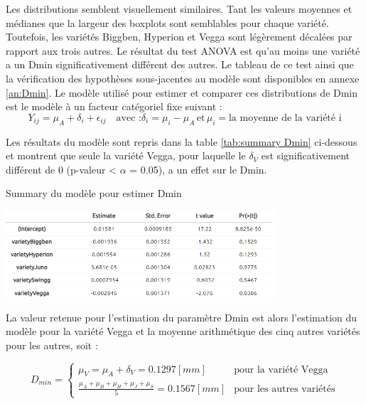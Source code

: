 Les distributions semblent visuellement similaires.
Tant les valeurs moyennes et médianes que la largeur des boxplots sont semblables pour chaque variété.
Toutefois, les variétés Biggben, Hyperion et Vegga sont légèrement décalées par rapport aux trois autres.
Le résultat du test ANOVA est qu'au moins une variété a un Dmin significativement différent des autres.
Le tableau de ce test ainsi que la vérification des hypothèses sous-jacentes au modèle sont disponibles en annexe \ref{an:Dmin}.
Le modèle utilisé pour estimer et comparer ces distributions de Dmin est le modèle à un facteur catégoriel fixe suivant :
\begin{equation}
    Y_{ij} = \mu_{A}+\delta_{i}+\epsilon_{ij} \quad \text{avec :} \delta_{i}=\mu_{i}-\mu_{A} \, \text{et} \, \mu_{i} = \text{la moyenne de la variété i}
\end{equation}

Les résultats du modèle sont repris dans la table \ref{tab:summary Dmin} ci-dessous et montrent que seule la variété Vegga, pour laquelle le $\delta_{V}$ est significativement différent de 0 (p-valeur < $\alpha$ = 0.05), a un effet sur le Dmin.

\begin{table}[ht]
    \centering
    \caption{Summary du modèle pour estimer Dmin}
    \includegraphics[width=0.75\textwidth]{Image/summary Dmin.png}
    \label{tab:summary Dmin}
\end{table}

La valeur retenue pour l'estimation du paramètre Dmin est alors l'estimation du modèle pour la variété Vegga et la moyenne arithmétique des cinq autres variétés pour les autres, soit :

\begin{equation}
    D_{min} = 
    \begin{cases}
        \mu_{V} = \mu_{A}+\delta_{V} = 0.1297 [mm] & \text{pour la variété Vegga} \\
        \frac{\mu_{A}+\mu_{B}+\mu_{H}+\mu_{J}+\mu_{S}}{5}=0.1567 [mm] & \text{pour les autres variétés}
    \end{cases}
\end{equation}

